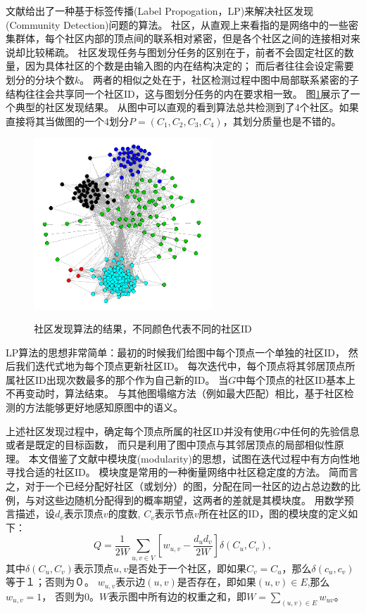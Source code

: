 \documentclass[master]{njuthesis}
\begin{document}
文献\cite{raghavan2007near}给出了一种基于标签传播(Label Propogation，LP)来解决社区发现(Community Detection)问题的算法。
社区，从直观上来看指的是网络中的一些密集群体，每个社区内部的顶点间的联系相对紧密，但是各个社区之间的连接相对来说却比较稀疏。
社区发现任务与图划分任务的区别在于，前者不会固定社区的数量，因为具体社区的个数是由输入图的内在结构决定的；
而后者往往会设定需要划分的分块个数$k$。
两者的相似之处在于，社区检测过程中图中局部联系紧密的子结构往往会共享同一个社区ID，这与图划分任务的内在要求相一致。
图\ref{fig:mlp_cd}展示了一个典型的社区发现结果。
从图中可以直观的看到算法总共检测到了4个社区。如果直接将其当做图的一个4划分$P=(C_1, C_2, C_3, C_4)$，其划分质量也是不错的。
\begin{figure}[h]
  \centering
  \includegraphics[width= 0.6\textwidth]{figure/lp.png}\\
  \caption{社区发现算法的结果，不同颜色代表不同的社区ID}
   \label{fig:mlp_cd}
\end{figure}

LP算法的思想非常简单：最初的时候我们给图中每个顶点一个单独的社区ID，
然后我们迭代式地为每个顶点更新社区ID。
每次迭代中，每个顶点将其邻居顶点所属社区ID出现次数最多的那个作为自己新的ID。
当$G$中每个顶点的社区ID基本上不再变动时，算法结束。
与其他图塌缩方法（例如最大匹配）相比，基于社区检测的方法能够更好地感知原图中的语义。


上述社区发现过程中，确定每个顶点所属的社区ID并没有使用$G$中任何的先验信息或者是既定的目标函数，
而只是利用了图中顶点与其邻居顶点的局部相似性原理。
本文借鉴了文献\cite{newman2006modularity}中模块度(modularity)的思想，试图在迭代过程中有方向性地寻找合适的社区ID。
模块度是常用的一种衡量网络中社区稳定度的方法。
简而言之，对于一个已经分配好社区（或划分）的图，分配在同一社区的边占总边数的比例，与对这些边随机分配得到的概率期望，这两者的差就是其模块度。
用数学预言描述，设$d_v$表示顶点$v$的度数, $C_v$表示节点$v$所在社区的ID，图的模块度的定义如下：
\begin{equation}
\label{eq:mod}
Q = \frac{1}{2W}\sum\limits_{u, v \in V} \left[w_{u,v} - \frac{{d_u}{d_v}}{2W} \right]\delta \left(C_u, C_v\right),
\end{equation}
其中$\delta(C_u, C_v)$表示顶点$u, v$是否处于一个社区，即如果$C_v = C_u$，那么$\delta(c_u, c_v)$等于１；否则为０。
$w_{u,v}$表示边$(u,v)$是否存在，即如果$(u,v)\in E$,那么$w_{u,v}=1$，
否则为0。$W$表示图中所有边的权重之和，即$W=\sum_{(u,v) \in E}w_{uv}$。
\end{document}
